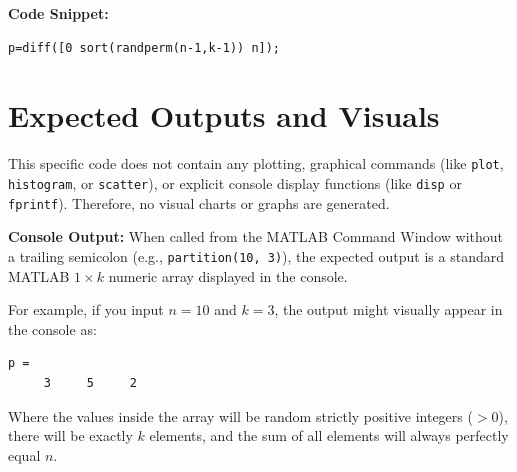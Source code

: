 \textbf{Code Snippet:}
\begin{lstlisting}
p=diff([0 sort(randperm(n-1,k-1)) n]);
\end{lstlisting}

\section{Expected Outputs and Visuals}

This specific code does not contain any plotting, graphical commands (like \texttt{plot}, \texttt{histogram}, or \texttt{scatter}), or explicit console display functions (like \texttt{disp} or \texttt{fprintf}). Therefore, no visual charts or graphs are generated.

\textbf{Console Output:}
When called from the MATLAB Command Window without a trailing semicolon (e.g., \texttt{partition(10, 3)}), the expected output is a standard MATLAB $1 \times k$ numeric array displayed in the console. 

For example, if you input $n=10$ and $k=3$, the output might visually appear in the console as:
\begin{verbatim}
p =
     3     5     2
\end{verbatim}

Where the values inside the array will be random strictly positive integers ($>0$), there will be exactly $k$ elements, and the sum of all elements will always perfectly equal $n$.